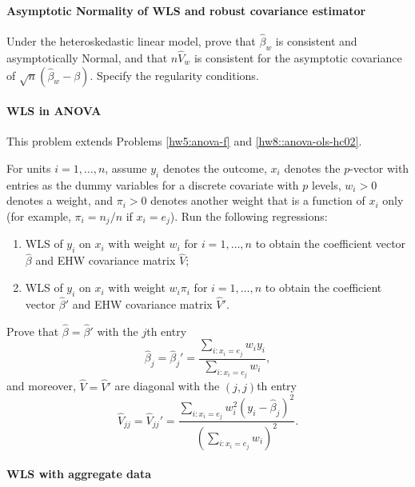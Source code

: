 \paragraph{Asymptotic Normality of WLS and robust covariance estimator}

Under the heteroskedastic linear model,  prove that $\hat{\beta}_{w}$ is consistent and asymptotically Normal,
and that $n\hat{V}_{w}$ is consistent for the asymptotic covariance
of $\sqrt{n}(\hat{\beta}_{w}-\beta).$ Specify the regularity conditions. 



\paragraph{WLS in ANOVA}\label{hw16::wls-anova}

This problem extends Problems \ref{hw5:anova-f}  and \ref{hw8::anova-ols-hc02}. 

For units $i=1,\ldots, n$, assume $y_i$ denotes the outcome, $x_i$ denotes the $p$-vector with entries as the dummy variables for a discrete covariate with $p$ levels, $w_i > 0$ denotes a weight, and $\pi_i > 0$ denotes another weight that is a function of $x_i$ only (for example, $\pi_i = n_j/n$ if $x_i = e_j$). Run the following regressions:
\begin{enumerate}[label=(R\arabic*), ref=R\arabic*]
\item
WLS of $y_i$ on $x_i$ with weight $w_i$ for $i=1,\ldots, n$ to obtain the coefficient vector $\hat{\beta}$ and EHW covariance matrix $\hat{V}$;
\item
WLS of $y_i$ on $x_i$ with weight $w_i \pi_i$ for $i=1,\ldots, n$ to obtain the coefficient vector $\hat{\beta}'$ and EHW covariance matrix $\hat{V}'$.
\end{enumerate}

Prove that 
$
\hat{\beta} = \hat{\beta}'  
$ 
with the $j$th entry
$$
\hat\beta_j=\hat\beta_j' = \frac{  \sum_{i: x_i = e_j}  w_i y_i }{  \sum_{i: x_i = e_j}  w_i},
$$
and moreover, $\hat{V} = \hat{V}'$ are diagonal with the $(j,j)$th entry
$$
\hat{V}_{jj} = \hat{V}_{jj}' = \frac{\sum_{i: x_i = e_j}  w_i^2 (y_i - \hat\beta_j)^2 }{ ( \sum_{i: x_i = e_j}  w_i   )^2  }  .
$$




\paragraph{WLS with aggregate data}\label{para::WLSaggregatedata}


